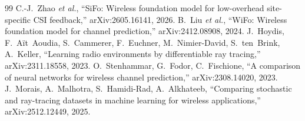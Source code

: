 \documentclass[11pt]{article}
\begin{document}
\begin{thebibliography}{99}
 C.-J.~Zhao \emph{et al.}, ``SiFo: Wireless foundation model for low-overhead site-specific CSI feedback,'' arXiv:2605.16141, 2026.
 B.~Liu \emph{et al.}, ``WiFo: Wireless foundation model for channel prediction,'' arXiv:2412.08908, 2024.
 J.~Hoydis, F.~A\"it~Aoudia, S.~Cammerer, F.~Euchner, M.~Nimier-David, S.~ten~Brink, A.~Keller, ``Learning radio environments by differentiable ray tracing,'' arXiv:2311.18558, 2023.
 O.~Stenhammar, G.~Fodor, C.~Fischione, ``A comparison of neural networks for wireless channel prediction,'' arXiv:2308.14020, 2023.
 J.~Morais, A.~Malhotra, S.~Hamidi-Rad, A.~Alkhateeb, ``Comparing stochastic and ray-tracing datasets in machine learning for wireless applications,'' arXiv:2512.12449, 2025.
\end{thebibliography}
\end{document}
